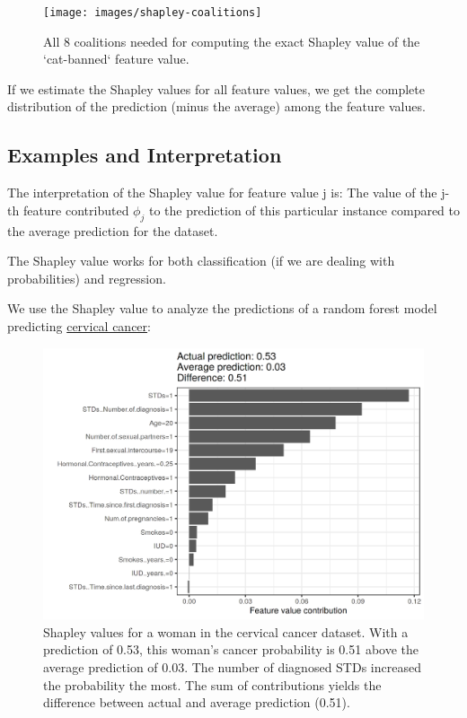 \documentclass[12pt,]{krantz}
\begin{document}
\begin{figure}

{\centering \texttt{[image: images/shapley-coalitions]} 

}

\caption{All 8 coalitions needed for computing the exact Shapley value of the `cat-banned` feature value.}\label{fig:shapley-coalitions}
\end{figure}

If we estimate the Shapley values for all feature values, we get the
complete distribution of the prediction (minus the average) among the
feature values.

\subsection{Examples and
Interpretation}\label{examples-and-interpretation}

The interpretation of the Shapley value for feature value j is: The
value of the j-th feature contributed \(\phi_j\) to the prediction of
this particular instance compared to the average prediction for the
dataset.

The Shapley value works for both classification (if we are dealing with
probabilities) and regression.

We use the Shapley value to analyze the predictions of a random forest
model predicting \protect\hyperlink{cervical}{cervical cancer}:

\begin{figure}

{\centering \includegraphics[width=\textwidth]{images/shapley-cervical-plot-1} 

}

\caption{Shapley values for a woman in the cervical cancer dataset. With a prediction of 0.53, this woman's cancer probability is 0.51 above the average prediction of 0.03. The number of diagnosed STDs increased the probability the most. The sum of contributions yields the difference between actual and average prediction (0.51).}\label{fig:shapley-cervical-plot}
\end{figure}
\end{document}
